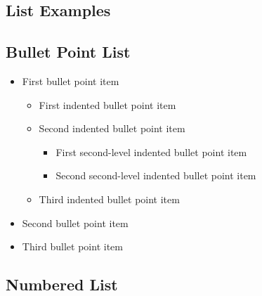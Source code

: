 \documentclass[a4paper]{CSMakotoTechnicalReport}
\begin{document}
\begin{multicols}{2}

    \section{List Examples}

    \subsection{Bullet Point List}

    \begin{itemize}
        \item First bullet point item
            \begin{itemize}
                \item First indented bullet point item
                \item Second indented bullet point item
                    \begin{itemize}
                        \item First second-level indented bullet point item
                        \item Second second-level indented bullet point item
                    \end{itemize}
                \item Third indented bullet point item
            \end{itemize}
        \item Second bullet point item
        \item Third bullet point item
    \end{itemize}


    \subsection{Numbered List}


\end{multicols}
\end{document}
